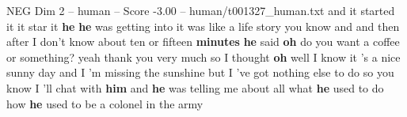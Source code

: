 \begin{textsample}{NEG Dim 2 – human – Score -3.00 – human/t001327\_human.txt}  \label{ex:f2_neg_001}
and it started it it star it \textbf{he} \textbf{he} was getting into it was like a life story you know and and then after I don't know about ten or fifteen \textbf{minutes} \textbf{he} said \textbf{oh} do you want a coffee or something? yeah thank you very much so I thought \textbf{oh} well I know it 's a nice sunny day and I 'm missing the sunshine but I 've got nothing else to do so you know I 'll chat with \textbf{him} and \textbf{he} was telling me about all what \textbf{he} used to do how \textbf{he} used to be a colonel in the army

\end{textsample}
